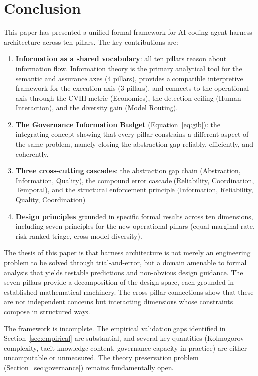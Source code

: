 \documentclass[11pt, a4paper]{googledeepmind}
\begin{document}
\section{Conclusion}
\label{sec:conclusion}

This paper has presented a unified formal framework for AI coding agent harness architecture across ten pillars. The key contributions are:

\begin{enumerate}
    \item \textbf{Information as a shared vocabulary}: all ten pillars reason about information flow. Information theory is the primary analytical tool for the semantic and assurance axes (4 pillars), provides a compatible interpretive framework for the execution axis (3 pillars), and connects to the operational axis through the CVIH metric (Economics), the detection ceiling (Human Interaction), and the diversity gain (Model Routing).
    \item \textbf{The Governance Information Budget} (Equation~\ref{eq:gib}): the integrating concept showing that every pillar constrains a different aspect of the same problem, namely closing the abstraction gap reliably, efficiently, and coherently.
    \item \textbf{Three cross-cutting cascades}: the abstraction gap chain (Abstraction, Information, Quality), the compound error cascade (Reliability, Coordination, Temporal), and the structural enforcement principle (Information, Reliability, Quality, Coordination).
    \item \textbf{Design principles} grounded in specific formal results across ten dimensions, including seven principles for the new operational pillars (equal marginal rate, risk-ranked triage, cross-model diversity).
\end{enumerate}

The thesis of this paper is that harness architecture is not merely an engineering problem to be solved through trial-and-error, but a domain amenable to formal analysis that yields testable predictions and non-obvious design guidance. The seven pillars provide a decomposition of the design space, each grounded in established mathematical machinery. The cross-pillar connections show that these are not independent concerns but interacting dimensions whose constraints compose in structured ways.

The framework is incomplete. The empirical validation gaps identified in Section~\ref{sec:empirical} are substantial, and several key quantities (Kolmogorov complexity, tacit knowledge content, governance capacity in practice) are either uncomputable or unmeasured. The theory preservation problem (Section~\ref{sec:governance}) remains fundamentally open.
\end{document}
